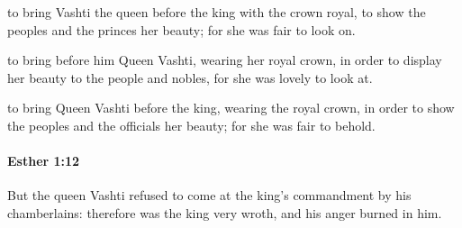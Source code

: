 			\begin{versebox}
					\item[BHS] 
					\item[LXX] 
					\item[ASV] to bring Vashti the queen before the king with the crown royal, to show the peoples and the princes her beauty; for she was fair to look on.
					\item[NIV] to bring before him Queen Vashti, wearing her royal crown, in order to display her beauty to the people and nobles, for she was lovely to look at.
					\item[NRSV] to bring Queen Vashti before the king, wearing the royal crown, in order to show the peoples and the officials her beauty; for she was fair to behold.
			\end{versebox}

		\paragraph{Esther 1:12} %
			\label{ESTHER-1-12}

			But the queen Vashti refused to come at the king’s commandment by his chamberlains: therefore was the king very wroth, and his anger burned in him.


